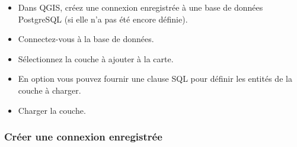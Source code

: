 \begin{itemize}
\item Dans QGIS, créez une connexion enregistrée à une base de données PostgreSQL (si elle n'a pas été encore définie).
\item Connectez-vous à la base de données.
\item Sélectionnez la couche à ajouter à la carte.
\item En option vous pouvez fournir une clause SQL  pour définir les entités de la couche à charger.
\item Charger la couche.
\end{itemize}

\subsubsection{Créer une connexion enregistrée}\label{sec:postgis_stored}


